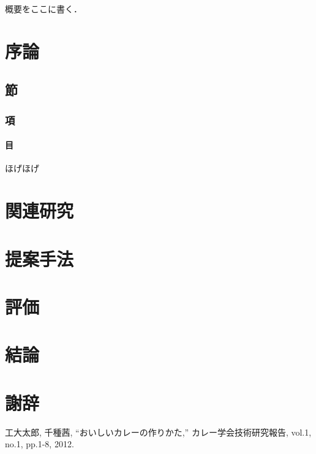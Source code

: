 \documentclass[a4paper,12pt]{jsarticle}
\date{平成xx年3月}
\begin{document}
\Front %
\MakeTitlePage

\begin{Abstract}
概要をここに書く．
\end{Abstract}

\TableOfContents

\Main %

\section{序論}

\subsection{節}

\subsubsection{項}

\paragraph{目}
ほげほげ

\section{関連研究}

\section{提案手法}

\section{評価}

\section{結論}

\section*{謝辞}

\begin{thebibliography}{99} %
\end{thebibliography}

\begin{Achievements} %

工大太郎, 千種茜,
``おいしいカレーの作りかた,''
カレー学会技術研究報告, vol.1, no.1, pp.1-8, 2012.

\end{Achievements}
\end{document}
